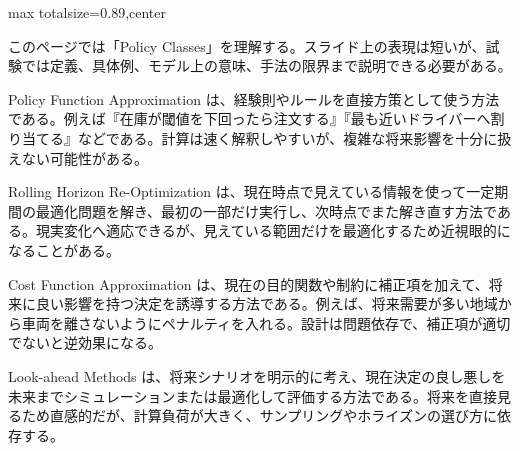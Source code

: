 \begin{minipage}[t]{0.58\textwidth}
\begin{adjustbox}{max totalsize={\textwidth}{0.89\textheight},center}
\begin{minipage}{\textwidth}\scriptsize
{}このページでは「Policy Classes」を理解する。スライド上の表現は短いが、試験では定義、具体例、モデル上の意味、手法の限界まで説明できる必要がある。\par
Policy Function Approximation は、経験則やルールを直接方策として使う方法である。例えば『在庫が閾値を下回ったら注文する』『最も近いドライバーへ割り当てる』などである。計算は速く解釈しやすいが、複雑な将来影響を十分に扱えない可能性がある。\par
Rolling Horizon Re-Optimization は、現在時点で見えている情報を使って一定期間の最適化問題を解き、最初の一部だけ実行し、次時点でまた解き直す方法である。現実変化へ適応できるが、見えている範囲だけを最適化するため近視眼的になることがある。\par
Cost Function Approximation は、現在の目的関数や制約に補正項を加えて、将来に良い影響を持つ決定を誘導する方法である。例えば、将来需要が多い地域から車両を離さないようにペナルティを入れる。設計は問題依存で、補正項が適切でないと逆効果になる。\par
Look-ahead Methods は、将来シナリオを明示的に考え、現在決定の良し悪しを未来までシミュレーションまたは最適化して評価する方法である。将来を直接見るため直感的だが、計算負荷が大きく、サンプリングやホライズンの選び方に依存する。\par

\end{minipage}
\end{adjustbox}
\end{minipage}
